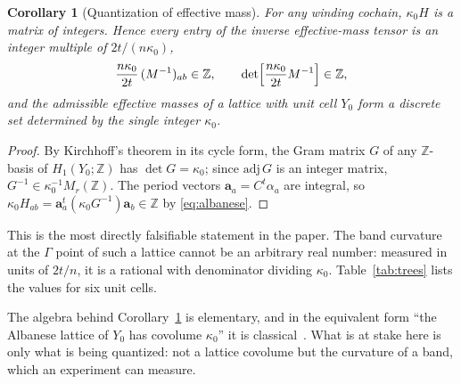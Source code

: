 \documentclass[aps,prb,reprint,amsmath,amssymb,floatfix,superscriptaddress]{revtex4-2}
\theoremstyle{plain}
\newtheorem{corollary}[theorem]{Corollary}
\theoremstyle{definition}
\theoremstyle{remark}
\newcommand{\Z}{\mathbb{Z}}
\begin{document}
\begin{corollary}[Quantization of effective mass]\label{cor:quant}
For any winding cochain, $\kappa_0H$ is a matrix of \emph{integers}. Hence every entry of
the inverse effective-mass tensor is an integer multiple of $2t/(n\kappa_0)$,
\begin{equation}\label{eq:quant}
\frac{n\kappa_0}{2t}\,(M^{-1})_{ab}\in\Z ,
\qquad
\det\Bigl[\frac{n\kappa_0}{2t}M^{-1}\Bigr]\in\Z ,
\end{equation}
and the admissible effective masses of a lattice with unit cell $Y_0$ form a discrete set
determined by the single integer $\kappa_0$.
\end{corollary}

\begin{proof}
By Kirchhoff's theorem in its cycle form, the Gram matrix $G$ of any $\Z$-basis of
$H_1(Y_0;\Z)$ has $\det G=\kappa_0$; since $\mathrm{adj}\,G$ is an integer matrix,
$G^{-1}\in\kappa_0^{-1}M_r(\Z)$. The period vectors $\bm a_a=C^{t}\alpha_a$ are integral, so
$\kappa_0H_{ab}=\bm a_a^{t}(\kappa_0G^{-1})\bm a_b\in\Z$ by \eqref{eq:albanese}.
\end{proof}

This is the most directly falsifiable statement in the paper. The band curvature at the
$\Gamma$ point of such a lattice cannot be an arbitrary real number: measured in units of
$2t/n$, it is a rational with denominator dividing $\kappa_0$. Table~\ref{tab:trees}
lists the values for six unit cells.

The algebra behind Corollary~\ref{cor:quant} is elementary, and in the equivalent form
``the Albanese lattice of $Y_0$ has covolume $\kappa_0$'' it is classical~\cite{KS3,BF}.
What is at stake here is only what is being quantized: not a lattice covolume but the
curvature of a band, which an experiment can measure.
\end{document}
